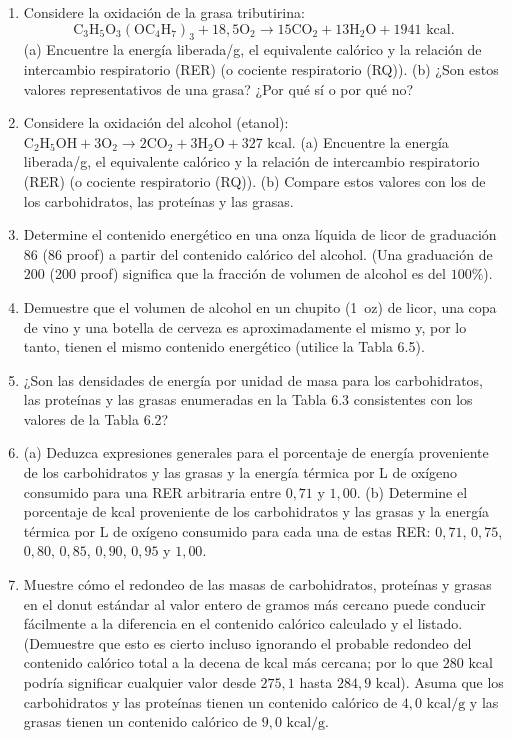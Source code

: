 \documentclass[12pt]{book}
\begin{document}
\begin{enumerate}
\item[6.5] Considere la oxidación de la grasa tributirina:
\begin{equation*}
\text{C}_3\text{H}_5\text{O}_3(\text{OC}_4\text{H}_7)_3 + 18{,}5\text{O}_2 \rightarrow 15\text{CO}_2 + 13\text{H}_2\text{O} + 1941\text{ kcal}.
\end{equation*}
(a) Encuentre la energía liberada/g, el equivalente calórico y la relación de intercambio respiratorio (RER) (o cociente respiratorio (RQ)). (b) ¿Son estos valores representativos de una grasa? ¿Por qué sí o por qué no?

\item[6.6] Considere la oxidación del alcohol (etanol): $\text{C}_2\text{H}_5\text{OH} + 3\text{O}_2 \rightarrow 2\text{CO}_2 + 3\text{H}_2\text{O} + 327\text{ kcal}$. (a) Encuentre la energía liberada/g, el equivalente calórico y la relación de intercambio respiratorio (RER) (o cociente respiratorio (RQ)). (b) Compare estos valores con los de los carbohidratos, las proteínas y las grasas.

\item[6.7] Determine el contenido energético en una onza líquida de licor de graduación $86$ (86 proof) a partir del contenido calórico del alcohol. (Una graduación de $200$ (200 proof) significa que la fracción de volumen de alcohol es del $100\%$).

\item[6.8] Demuestre que el volumen de alcohol en un chupito (1~oz) de licor, una copa de vino y una botella de cerveza es aproximadamente el mismo y, por lo tanto, tienen el mismo contenido energético (utilice la Tabla 6.5).

\item[6.9] ¿Son las densidades de energía por unidad de masa para los carbohidratos, las proteínas y las grasas enumeradas en la Tabla 6.3 consistentes con los valores de la Tabla 6.2?

\item[6.10] (a) Deduzca expresiones generales para el porcentaje de energía proveniente de los carbohidratos y las grasas y la energía térmica por L de oxígeno consumido para una RER arbitraria entre $0{,}71$ y $1{,}00$. (b) Determine el porcentaje de kcal proveniente de los carbohidratos y las grasas y la energía térmica por L de oxígeno consumido para cada una de estas RER: $0{,}71$, $0{,}75$, $0{,}80$, $0{,}85$, $0{,}90$, $0{,}95$ y $1{,}00$.

\item[6.11] Muestre cómo el redondeo de las masas de carbohidratos, proteínas y grasas en el donut estándar al valor entero de gramos más cercano puede conducir fácilmente a la diferencia en el contenido calórico calculado y el listado. (Demuestre que esto es cierto incluso ignorando el probable redondeo del contenido calórico total a la decena de kcal más cercana; por lo que $280\text{ kcal}$ podría significar cualquier valor desde $275{,}1$ hasta $284{,}9\text{ kcal}$). Asuma que los carbohidratos y las proteínas tienen un contenido calórico de $4{,}0\text{ kcal/g}$ y las grasas tienen un contenido calórico de $9{,}0\text{ kcal/g}$.


\end{enumerate}
\end{document}

